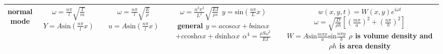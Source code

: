 \documentclass{article}
\begin{document}
\begin{multicols*}{3}
\begin{table*}
\begin{tabular}{|c|c|c|c|c|}
      \hline
      \makecell[c]{normal\\ mode}& \makecell[c]{$\omega=\frac{n\pi}{l}\sqrt{\frac{T}{m}}$ \\$Y=A \text{sin}(\frac{n\pi}{l}x)$}
      &\makecell[c]{$\omega=\frac{n\pi}{l}\sqrt{\frac{E}{\rho}}$\\ $u=A \text{sin}(\frac{n\pi}{l}x)$}
      &\makecell[c]{
        $\omega=\frac{n^{2}\pi^{2}}{L^{2}}\sqrt{\frac{EI}{\rho s}}$
        $y=\text{sin}(\frac{n \pi}{L}x)$\\
        general $y=a\text{cos}\alpha x+b\text{sin}\alpha x$\\
        $+c \text{cosh}\alpha x+d \text{sinh}\alpha x$\\
        $\alpha^4 = \frac{\rho S \omega^2}{EI}$  
      }
      &\makecell[c]{
        $w(x,y,t)=W(x,y)e^{i\omega t}$\\
        $\omega=\sqrt{\frac{D}{\rho h}}[(\frac{m\pi}{a})^{2}+(\frac{n \pi}{b})^{2}]$\\
      $W=A\text{sin}\frac{m\pi x}{a}\text{sin}\frac{n \pi y}{b}$\\
      \textbf{$\rho$ is volume density and $\rho h$ is area density}
      }\\
      \hline
    \end{tabular}
  \end{table*}

\end{multicols*}
\end{document}
